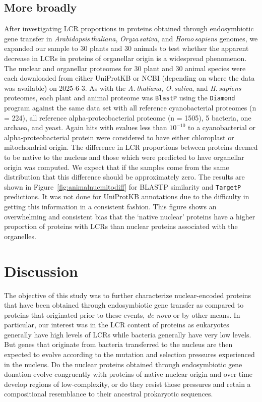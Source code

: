 \documentclass[a4paper,12pt]{article}
\newcommand{\arab}{\mbox{\textit{Arabidopsis\,thaliana}}\xspace}
\newcommand{\ath}{\mbox{\textit{A.\,thaliana}}\xspace}
\newcommand{\oryz}{\mbox{\textit{Oryza\,sativa}}\xspace}
\newcommand{\osa}{\mbox{\textit{O.\,sativa}}\xspace}
\newcommand{\homo}{\mbox{\textit{Homo\,sapiens}}\xspace}
\newcommand{\hsa}{\mbox{\textit{H.\,sapiens}}\xspace}
\newcommand{\tget}{\mbox{\texttt{TargetP}}\xspace}
\renewcommand{\diamond}{\mbox{\texttt{Diamond}}\xspace}
\newcommand{\blastp}{\mbox{\texttt{BlastP}}\xspace}
\begin{document}
\begin{multicols}{2}
\subsection*{More broadly}
After investigating LCR proportions in proteins obtained through
endosymbiotic gene transfer in \arab, \oryz, and \homo genomes,
we expanded our sample to 30 plants and 30 animals to test whether
the apparent decrease in LCRs in proteins of organellar origin is a
widespread phenomenon. The nuclear and organellar proteomes for 30 plant
and 30 animal species were each downloaded from either UniProtKB or NCBI
(depending on where the data was available) on 2025-6-3. As with the \ath,
\osa, and \hsa proteomes, each plant and animal proteome was \blastp
using the \diamond program against the same data set with all reference
cyanobacterial proteomes (n = 224), all reference alpha-proteobacterial
proteome (n = 1505), 5 bacteria, one archaea, and yeast. Again hits with
evalues less than $10^{-10}$ to a cyanobacterial or alpha-proteobacterial
protein were considered to have either chloroplast or mitochondrial
origin.  The difference in LCR proportions between proteins deemed to be
native to the nucleus and those which were predicted to have organellar
origin was computed.  We expect that if the samples come from the
same distribution that this difference should be approximately zero.
The results are shown in Figure~\ref{fig:animalnucmitodiff} for BLASTP
similarity and \tget predictions.  It was not done for UniProtKB
annotations due to the difficulty in getting this information in a
consistent fashion.  This figure shows an overwhelming and consistent
bias that the `native nuclear' proteins have a higher proportion of
proteins with LCRs than nuclear proteins associated with the organelles.




\section*{Discussion}

The objective of this study was to further characterize nuclear-encoded
proteins that have been obtained through endosymbiotic gene transfer as
compared to proteins that originated prior to these events, \textit{de
novo} or by other means.  In particular, our interest was in the LCR
content of proteins as eukaryotes generally have high levels of LCRs
while bacteria generally have very low levels.  But genes that originate
from bacteria transferred to the nucleus are then expected to evolve
according to the mutation and selection pressures experienced in the
nucleus.  Do the nuclear proteins obtained through endosymbiotic gene
donation evolve congruently with proteins of native nuclear origin and
over time develop regions of low-complexity, or do they resist those
pressures and retain a compositional resemblance to their ancestral
prokaryotic sequences.


\end{multicols}
\end{document}
